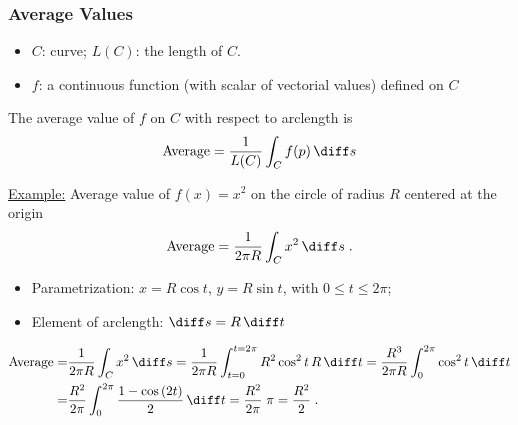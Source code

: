 \begin{frame}
\small
  \frametitle{Average Values}

\begin{itemize}
\item $C$:  curve; $L(C)$: the length of $C$.
\item $f$: a continuous function (with scalar of vectorial values) defined on $C$
\end{itemize}

The average value of $f$ on $C$ with respect to arclength is
%
$$\text{Average} = \frac{1}{L(C)} \int_C f(p)\,  \diff s$$
%

\underline{Example:} Average value of $f(x) = x^2$ on the circle of radius $R$ centered at the origin 
%
$$\text{Average} = \frac{1}{2\pi R} \int_C x^2 \, \diff s \; .$$
%
\pause
%
\begin{itemize}
\item Parametrization:  $x=R\cos{t}$, $y=R\sin{t}$, with $0 \leqslant t \leqslant 2\pi$;
\item Element of arclength: $\diff s = R\, \diff t$
\end{itemize}
\begin{align*}
  \text{Average} = & \frac{1}{2\pi R} \int_C x^2 \, \diff s = \frac{1}{2\pi R} \int_{t=0}^{t=2\pi} R^2\cos^2{t}\,  R \, \diff t = \frac{R^3}{2\pi R} \int_0^{2\pi} \cos^2{t}\, \diff t \\
  = & \frac{R^2}{2\pi} \int_0^{2\pi} \frac{1-\cos{(2t)}}{2}\, \diff t = \frac{R^2}{2\pi} \; \pi = \frac{R^2}{2}\; .
\end{align*}
\end{frame}